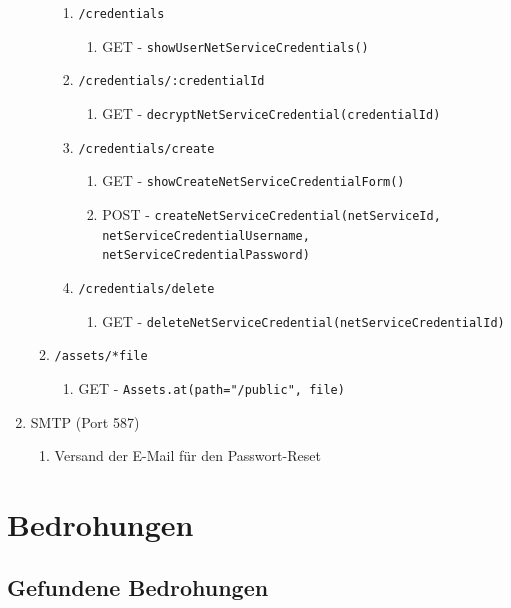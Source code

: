 \documentclass[12pt,DIV14,BCOR10mm,a4paper,parskip=half-,headsepline,headinclude,english,ngerman,bibliography=totocnumbered]{scrreprt}
\begin{document}
\begin{enumerate}
\begin{enumerate}
\begin{enumerate}
     \item \texttt{/credentials}
      \begin{enumerate}
        \item GET - \texttt{showUserNetServiceCredentials()}
      \end{enumerate}
      \item \texttt{/credentials/:credentialId}
      \begin{enumerate}
        \item GET - \texttt{decryptNetServiceCredential(credentialId)}
      \end{enumerate}
      \item \texttt{/credentials/create}
      \begin{enumerate}
        \item GET - \texttt{showCreateNetServiceCredentialForm()}
        \item POST - \texttt{createNetServiceCredential(netServiceId, netServiceCredentialUsername, netServiceCredentialPassword)}
      \end{enumerate}
      \item \texttt{/credentials/delete}
      \begin{enumerate}
        \item GET - \texttt{deleteNetServiceCredential(netServiceCredentialId)}
      \end{enumerate}
    \end{enumerate}

  \item \texttt{/assets/*file}
    \begin{enumerate}
      \item GET - \texttt{Assets.at(path="/public", file)}
    \end{enumerate}
  \end{enumerate}
  \item SMTP (Port 587)
  \begin{enumerate}
    \item Versand der E-Mail für den Passwort-Reset
  \end{enumerate}
\end{enumerate}

\chapter{Bedrohungen}
\section{Gefundene Bedrohungen}
\end{document}
